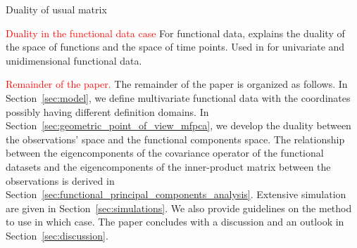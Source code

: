 Duality of usual matrix \cite{escofierTraitementSimultaneVariables1979,saportaSimultaneousAnalysisQualitative1990,pagesAnalyseFactorielleDonnees2004,hardleAppliedMultivariateStatistical2019}


\textcolor{red}{Duality in the functional data case}
For functional data, \cite{ramsayWhenDataAre1982a} explains the duality of the space of functions and the space of time points. Used in \cite{benkoCommonFunctionalPrincipal2009} for univariate and unidimensional functional data. \cite{chenQuantifyingInfiniteDimensionalData2017}


\textcolor{red}{Remainder of the paper.}
The remainder of the paper is organized as follows. In Section~\ref{sec:model}, we define multivariate functional data with the coordinates possibly having different definition domains. In Section~\ref{sec:geometric_point_of_view_mfpca}, we develop the duality between the observations' space and the functional components space. The relationship between the eigencomponents of the covariance operator of the functional datasets and the eigencomponents of the inner-product matrix between the observations is derived in Section~\ref{sec:functional_principal_components_analysis}. Extensive simulation are given in Section~\ref{sec:simulations}. We also provide guidelines on the method to use in which case. The paper concludes with a discussion and an outlook in Section~\ref{sec:discussion}.

